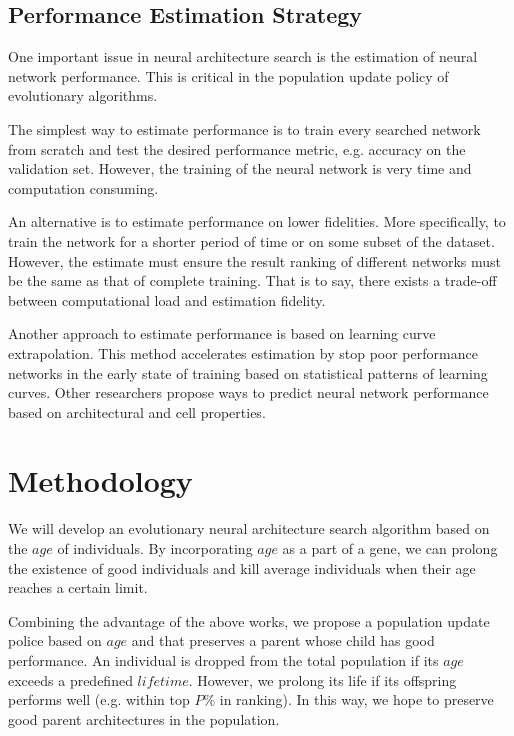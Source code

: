 \documentclass[conference]{IEEEtran}
\begin{document}
  \subsection{Performance Estimation Strategy}
  One important issue in neural architecture search is the estimation of neural network performance. This is critical in the population update policy of evolutionary algorithms. 

  The simplest way to estimate performance is to train every searched network from scratch and test the desired performance metric, e.g. accuracy on the validation set. However, the training of the neural network is very time and computation consuming. 
  
  An alternative is to estimate performance on lower fidelities. More specifically, to train the network for a shorter period of time\cite{zoph2018learning} or on some subset of the dataset\cite{klein2016fast}. However, the estimate must ensure the result ranking of different networks must be the same as that of complete training. That is to say, there exists a trade-off between computational load and estimation fidelity.

  Another approach to estimate performance is based on learning curve extrapolation\cite{domhan2015speeding}. This method accelerates estimation by stop poor performance networks in the early state of training based on statistical patterns of learning curves. Other researchers propose ways to predict neural network performance based on architectural and cell properties\cite{liu2018progressive}. 

  \section{Methodology}

  We will develop an evolutionary neural architecture search algorithm based on the $age$ of individuals. By incorporating $age$ as a part of a gene, we can prolong the existence of good individuals\cite{DBLP:journals/corr/abs-1802-01548} and kill average individuals when their age reaches a certain limit\cite{Hornby:2006:AAP:1143997.1144142}. 

  Combining the advantage of the above works, we propose a population update police based on $age$ and that preserves a parent whose child has good performance. An individual is dropped from the total population if its $age$ exceeds a predefined $lifetime$. However, we prolong its life if its offspring performs well (e.g. within top $P\%$ in ranking). In this way, we hope to preserve good parent architectures in the population.
\end{document}
